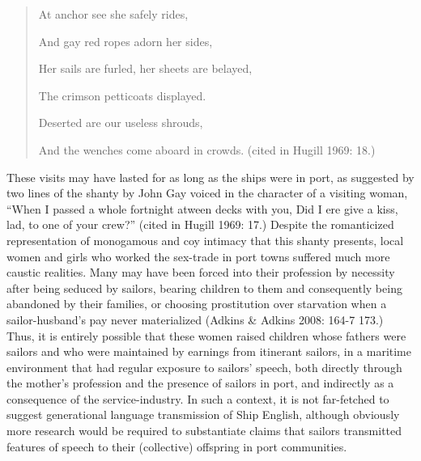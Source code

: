 \begin{quotation}
At anchor see she safely rides, 

And gay red ropes adorn her sides, 

Her sails are furled, her sheets are belayed, 

The crimson petticoats displayed. 

Deserted are our useless shrouds, 

And the wenches come aboard in crowds. (cited in Hugill 1969: 18.)

\end{quotation}
\begin{styleStandard}
These visits may have lasted for as long as the ships were in port, as suggested by two lines of the shanty by John Gay voiced in the character of a visiting woman, “When I passed a whole fortnight atween decks with you, Did I ere give a kiss, lad, to one of your crew?” (cited in Hugill 1969: 17.) Despite the romanticized representation of monogamous and coy intimacy that this shanty presents, local women and girls who worked the sex-trade in port towns suffered much more caustic realities. Many may have been forced into their profession by necessity after being seduced by sailors, bearing children to them and consequently being abandoned by their families, or choosing prostitution over starvation when a sailor-husband’s pay never materialized (Adkins \& Adkins 2008: 164-7 173.) Thus, it is entirely possible that these women raised children whose fathers were sailors and who were maintained by earnings from itinerant sailors, in a maritime environment that had regular exposure to sailors’ speech, both directly through the mother’s profession and the presence of sailors in port, and indirectly as a consequence of the service-industry. In such a context, it is not far-fetched to suggest generational language transmission of Ship English, although obviously more research would be required to substantiate claims that sailors transmitted features of speech to their (collective) offspring in port communities. 
\end{styleStandard}


